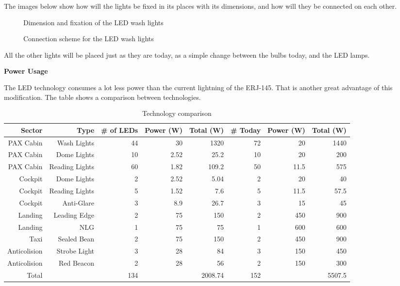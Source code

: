 The images below show how will the lights be fixed in its places with its dimensions, and how will they be connected on each other.


\begin{figure}[H] %
\caption{Dimension and fixation of the LED wash lights}
\label{fig:wash1}
\end{figure}


\begin{figure}[H] %
\caption{Connection scheme for the LED wash lights}
\label{fig:wash2}
\end{figure}

All the other lights will be placed just as they are today, as a simple change between the bulbs today, and the LED lamps.

\textbf{Power Usage}

The LED technology consumes a lot less power than the current lightning of the ERJ-145. That is another great advantage of this modification. The table  shows a comparison between technologies.

\begin{table}[htbp]
  \centering
  \caption{Technology comparison}
    \begin{tabular}{rrrrrrrr}
    \toprule
    Sector & Type  & \# of LEDs & Power (W) & Total (W) & \# Today & Power (W) & Total (W) \\
    \midrule
    PAX Cabin & Wash Lights & 44    & 30    & 1320  & 72    & 20    & 1440 \\
    PAX Cabin & Dome Lights & 10    & 2.52  & 25.2  & 10    & 20    & 200 \\
    PAX Cabin & Reading Lights & 60    & 1.82  & 109.2 & 50    & 11.5  & 575 \\
    Cockpit & Dome Lights & 2     & 2.52  & 5.04  & 2     & 20    & 40 \\
    Cockpit & Reading Lights & 5     & 1.52  & 7.6   & 5     & 11.5  & 57.5 \\
    Cockpit & Anti-Glare & 3     & 8.9   & 26.7  & 3     & 15    & 45 \\
    Landing & Leading Edge & 2     & 75    & 150   & 2     & 450   & 900 \\
    Landing & NLG   & 1     & 75    & 75    & 1     & 600   & 600 \\
    Taxi  & Sealed Bean & 2     & 75    & 150   & 2     & 450   & 900 \\
    Anticolision  & Strobe Light & 3     & 28    & 84    & 3     & 150   & 450 \\
    Anticolision  & Red Beacon & 2     & 28    & 56    & 2     & 150   & 300 \\
    Total &       & 134   &       & 2008.74 & 152   &       & 5507.5 \\
    \bottomrule
    \end{tabular}%
  \label{tab:LEDTechCompare}%
\end{table}%


